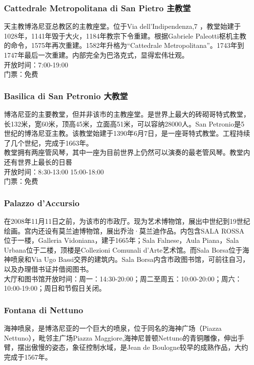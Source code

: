 \subsubsection{Cattedrale Metropolitana di San Pietro 主教堂}
天主教博洛尼亚总教区的主教座堂。位于Via dell'Indipendenza,7 ，教堂始建于1028年，1141年毁于大火，1184年教宗下令重建。根据Gabriele Paleotti枢机主教的命令，1575年再次重建。1582年升格为“Cattedrale Metropolitana”。1743年到1747年最后一次重建。内部完全为巴洛克式，显得宏伟壮观。\\
开放时间：7:00-19:00\\
门票：免费

\subsubsection{Basilica di San Petronio 大教堂}
博洛尼亚的主要教堂，但并非该市的主教座堂。是世界上最大的砖砌哥特式教堂，长132米，宽60米，顶高45米，立面高51米，可以容纳28000人。San Petronio是5世纪的博洛尼亚主教。该教堂始建于1390年6月7日，是一座哥特式教堂。工程持续了几个世纪，完成于1663年。\\
教堂拥有两座管风琴，其中一座为目前世界上仍然可以演奏的最老管风琴。教堂内还有世界上最长的日晷\\
开放时间：8:30-13:00 15:00-18:00\\
门票：免费

\subsubsection{Palazzo d'Accursio}
在2008年11月11日之前，为该市的市政厅。现为艺术博物馆，展出中世纪到19世纪绘画。宫内还设有莫兰迪博物馆，展出乔治·莫兰迪作品。内包含SALA ROSSA位于一楼，Galleria Vidoniana，建于1665年；Sala Falnese，Aula Piana，Sala Urbana位于二楼，顶楼是Collezioni Comunali d'Arte艺术馆。而Sala Borsa位于海神喷泉和Via Ugo Bassi交界的建筑内。Sala Borsa内含市政图书馆，可前往自习，以及办理借书证并借阅图书。\\
大厅和图书馆开放时间：周一：14:30-20:00；周二至周五：10:00-20:00；周六：10:00-19:00；周日和节假日关闭。\\

\subsubsection{Fontana di Nettuno}
海神喷泉，是博洛尼亚的一个巨大的喷泉，位于同名的海神广场（Piazza Nettuno），毗邻主广场Piazza Maggiore,海神尼普顿Nettuno的青铜雕像，伸出手臂，摆出傲慢的姿态，象征控制水域，是Jean de Boulogne较早的成熟作品，大约完成于1567年。

